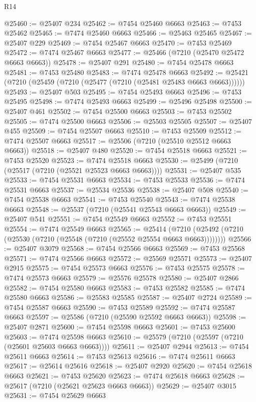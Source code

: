 \begin{lexlean}{R14}
\begin{coremodule}
@25460 := @25407 @234
@25462 := @7454 @25460 @6663
@25463 := @7453 @25462
@25465 := @7474 @25460 @6663
@25466 := @25463 @25465
@25467 := @25407 @229
@25469 := @7454 @25467 @6663
@25470 := @7453 @25469
@25472 := @7474 @25467 @6663
@25477 := @25466 (@7210 (@25470 @25472 @6663 @6663))
@25478 := @25407 @291
@25480 := @7454 @25478 @6663
@25481 := @7453 @25480
@25483 := @7474 @25478 @6663
@25492 := @25421 (@7210 (@25459 (@7210 (@25477 (@7210 (@25481 @25483 @6663 @6663))))))
@25493 := @25407 @503
@25495 := @7454 @25493 @6663
@25496 := @7453 @25495
@25498 := @7474 @25493 @6663
@25499 := @25496 @25498
@25500 := @25407 @461
@25502 := @7454 @25500 @6663
@25503 := @7453 @25502
@25505 := @7474 @25500 @6663
@25506 := @25503 @25505
@25507 := @25407 @455
@25509 := @7454 @25507 @6663
@25510 := @7453 @25509
@25512 := @7474 @25507 @6663
@25517 := @25506 (@7210 (@25510 @25512 @6663 @6663))
@25518 := @25407 @480
@25520 := @7454 @25518 @6663
@25521 := @7453 @25520
@25523 := @7474 @25518 @6663
@25530 := @25499 (@7210 (@25517 (@7210 (@25521 @25523 @6663 @6663))))
@25531 := @25407 @535
@25533 := @7454 @25531 @6663
@25534 := @7453 @25533
@25536 := @7474 @25531 @6663
@25537 := @25534 @25536
@25538 := @25407 @508
@25540 := @7454 @25538 @6663
@25541 := @7453 @25540
@25543 := @7474 @25538 @6663
@25548 := @25537 (@7210 (@25541 @25543 @6663 @6663))
@25549 := @25407 @541
@25551 := @7454 @25549 @6663
@25552 := @7453 @25551
@25554 := @7474 @25549 @6663
@25565 := @25414
    (@7210 (@25492 (@7210 (@25530 (@7210 (@25548 (@7210 (@25552 @25554 @6663 @6663))))))))
@25566 := @25407 @3079
@25568 := @7454 @25566 @6663
@25569 := @7453 @25568
@25571 := @7474 @25566 @6663
@25572 := @25569 @25571
@25573 := @25407 @2915
@25575 := @7454 @25573 @6663
@25576 := @7453 @25575
@25578 := @7474 @25573 @6663
@25579 := @25576 @25578
@25580 := @25407 @2866
@25582 := @7454 @25580 @6663
@25583 := @7453 @25582
@25585 := @7474 @25580 @6663
@25586 := @25583 @25585
@25587 := @25407 @2724
@25589 := @7454 @25587 @6663
@25590 := @7453 @25589
@25592 := @7474 @25587 @6663
@25597 := @25586 (@7210 (@25590 @25592 @6663 @6663))
@25598 := @25407 @2871
@25600 := @7454 @25598 @6663
@25601 := @7453 @25600
@25603 := @7474 @25598 @6663
@25610 := @25579 (@7210 (@25597 (@7210 (@25601 @25603 @6663 @6663))))
@25611 := @25407 @2944
@25613 := @7454 @25611 @6663
@25614 := @7453 @25613
@25616 := @7474 @25611 @6663
@25617 := @25614 @25616
@25618 := @25407 @2920
@25620 := @7454 @25618 @6663
@25621 := @7453 @25620
@25623 := @7474 @25618 @6663
@25628 := @25617 (@7210 (@25621 @25623 @6663 @6663))
@25629 := @25407 @3015
@25631 := @7454 @25629 @6663

\end{coremodule}
\end{lexlean}
